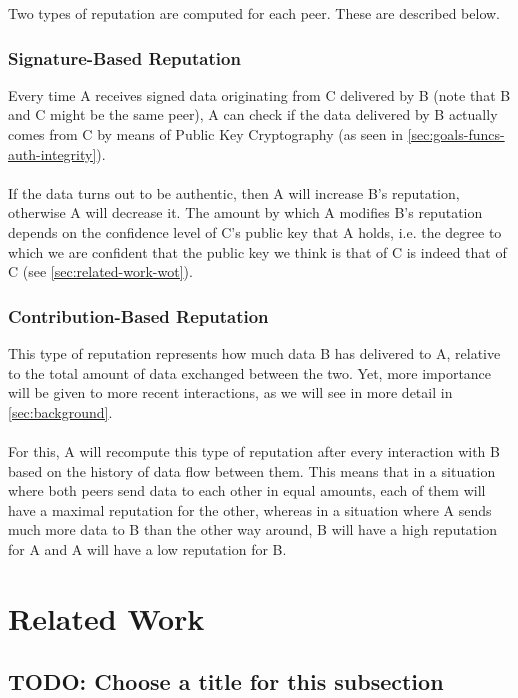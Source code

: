 \documentclass[]{article}
\begin{document}
        Two types of reputation are computed for each peer. These are described below.
        
            \subsubsection{Signature-Based Reputation}
            \label{sec:sig-based-rep}
            Every time A receives signed data originating from C delivered by B (note that B and C might be the same peer), A can check if the data delivered by B actually comes from C by means of Public Key Cryptography (as seen in \ref{sec:goals-funcs-auth-integrity}).
            \\\\
            If the data turns out to be authentic, then A will increase B's reputation, otherwise A will decrease it.
            The amount by which A modifies B's reputation depends on the confidence level of C's public key that A holds, i.e. the degree to which we are confident that the public key we think is that of C is indeed that of C (see \ref{sec:related-work-wot}).
            
            \subsubsection{Contribution-Based Reputation}
            This type of reputation represents how much data B has delivered to A, relative to the total amount of data exchanged between the two.
            Yet, more importance will be given to more recent interactions, as we will see in more detail in \ref{sec:background}.
            \\\\
            For this, A will recompute this type of reputation after every interaction with B based on the history of data flow between them.
            This means that in a situation where both peers send data to each other in equal amounts, each of them will have a maximal reputation for the other, whereas in a situation where A sends much more data to B than the other way around, B will have a high reputation for A and A will have a low reputation for B.
        
    \section{Related Work}
        
        \subsection{TODO: Choose a title for this subsection}
            
\end{document}
